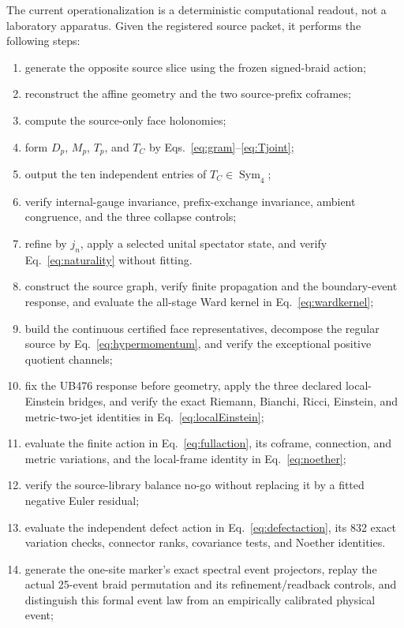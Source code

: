 \documentclass[11pt]{article}
\theoremstyle{definition}
\theoremstyle{remark}
\newcommand{\Sym}{\operatorname{Sym}}
\begin{document}
The current operationalization is a deterministic computational readout, not a laboratory apparatus. Given the registered source packet, it performs the following steps:
\begin{enumerate}
\item generate the opposite source slice using the frozen signed-braid action;
\item reconstruct the affine geometry and the two source-prefix coframes;
\item compute the source-only face holonomies;
\item form $D_p$, $M_p$, $T_p$, and $T_C$ by Eqs.~\eqref{eq:gram}--\eqref{eq:Tjoint};
\item output the ten independent entries of $T_C\in\Sym_4$;
\item verify internal-gauge invariance, prefix-exchange invariance, ambient congruence, and the three collapse controls;
\item refine by $j_n$, apply a selected unital spectator state, and verify Eq.~\eqref{eq:naturality} without fitting.
\item construct the source graph, verify finite propagation and the boundary-event response, and evaluate the all-stage Ward kernel in Eq.~\eqref{eq:wardkernel};
\item build the continuous certified face representatives, decompose the regular source by Eq.~\eqref{eq:hypermomentum}, and verify the exceptional positive quotient channels;
\item fix the UB476 response before geometry, apply the three declared local-Einstein bridges, and verify the exact Riemann, Bianchi, Ricci, Einstein, and metric-two-jet identities in Eq.~\eqref{eq:localEinstein};
\item evaluate the finite action in Eq.~\eqref{eq:fullaction}, its coframe, connection, and metric variations, and the local-frame identity in Eq.~\eqref{eq:noether};
\item verify the source-library balance no-go without replacing it by a fitted negative Euler residual;
\item evaluate the independent defect action in Eq.~\eqref{eq:defectaction}, its 832 exact variation checks, connector ranks, covariance tests, and Noether identities.
\item generate the one-site marker's exact spectral event projectors, replay the actual 25-event braid permutation and its refinement/readback controls, and distinguish this formal event law from an empirically calibrated physical event;

\end{enumerate}
\end{document}

